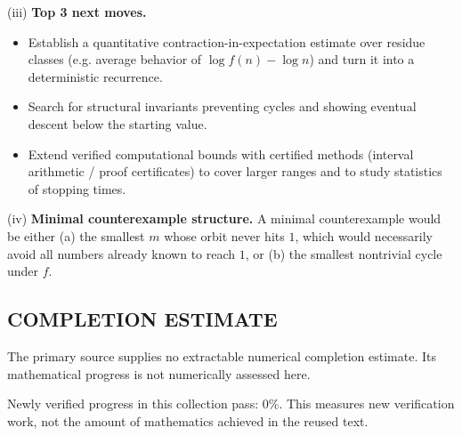 (iii) \textbf{Top 3 next moves.}
\begin{itemize}
\item Establish a quantitative contraction-in-expectation estimate over residue classes (e.g. average behavior of $\log f(n)-\log n$) and turn it into a deterministic recurrence.
\item Search for structural invariants preventing cycles and showing eventual descent below the starting value.
\item Extend verified computational bounds with certified methods (interval arithmetic / proof certificates) to cover larger ranges and to study statistics of stopping times.
\end{itemize}

(iv) \textbf{Minimal counterexample structure.}
A minimal counterexample would be either (a) the smallest $m$ whose orbit never hits $1$, which would necessarily avoid all numbers already known to reach $1$, or (b) the smallest nontrivial cycle under $f$.



\subsection*{COMPLETION ESTIMATE}
The primary source supplies no extractable numerical completion estimate. Its mathematical progress is not numerically assessed here.

Newly verified progress in this collection pass: $0\%$. This measures new verification work, not the amount of mathematics achieved in the reused text.
